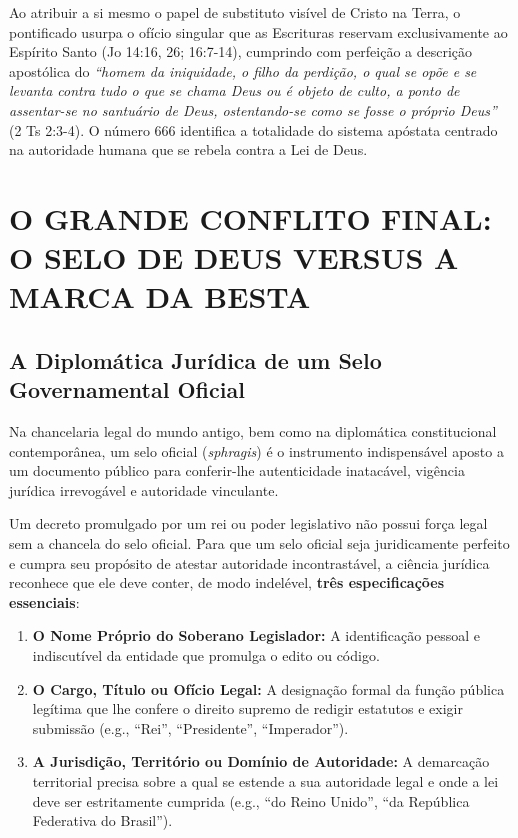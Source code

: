 Ao atribuir a si mesmo o papel de substituto visível de Cristo na Terra, o pontificado usurpa o ofício singular que as Escrituras reservam exclusivamente ao Espírito Santo (Jo 14:16, 26; 16:7-14), cumprindo com perfeição a descrição apostólica do \textit{``homem da iniquidade, o filho da perdição, o qual se opõe e se levanta contra tudo o que se chama Deus ou é objeto de culto, a ponto de assentar-se no santuário de Deus, ostentando-se como se fosse o próprio Deus''} (2 Ts 2:3-4). O número 666 identifica a totalidade do sistema apóstata centrado na autoridade humana que se rebela contra a Lei de Deus.



\section{O GRANDE CONFLITO FINAL: O SELO DE DEUS VERSUS A MARCA DA BESTA}



\subsection{A Diplomática Jurídica de um Selo Governamental Oficial}


Na chancelaria legal do mundo antigo, bem como na diplomática constitucional contemporânea, um selo oficial (\textit{sphragis}) é o instrumento indispensável aposto a um documento público para conferir-lhe autenticidade inatacável, vigência jurídica irrevogável e autoridade vinculante.

Um decreto promulgado por um rei ou poder legislativo não possui força legal sem a chancela do selo oficial. Para que um selo oficial seja juridicamente perfeito e cumpra seu propósito de atestar autoridade incontrastável, a ciência jurídica reconhece que ele deve conter, de modo indelével, \textbf{três especificações essenciais}:

\begin{enumerate}
  \item \textbf{O Nome Próprio do Soberano Legislador:} A identificação pessoal e indiscutível da entidade que promulga o edito ou código.
  \item \textbf{O Cargo, Título ou Ofício Legal:} A designação formal da função pública legítima que lhe confere o direito supremo de redigir estatutos e exigir submissão (e.g., ``Rei'', ``Presidente'', ``Imperador'').
  \item \textbf{A Jurisdição, Território ou Domínio de Autoridade:} A demarcação territorial precisa sobre a qual se estende a sua autoridade legal e onde a lei deve ser estritamente cumprida (e.g., ``do Reino Unido'', ``da República Federativa do Brasil'').
\end{enumerate}


